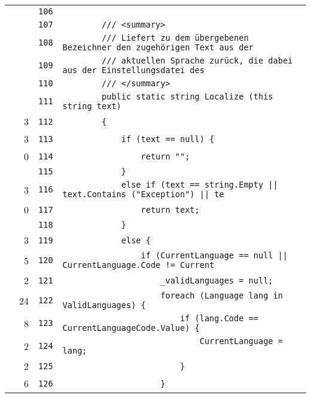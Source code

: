 \documentclass[a4paper,10pt]{article}
\begin{document}
\begin{longtable}[l]{lrrl}
\cellcolor{gray} &  & \verb~106~ & \verb~~\\
\cellcolor{gray} &  & \verb~107~ & \verb~        /// <summary>~\\
\cellcolor{gray} &  & \verb~108~ & \verb~        /// Liefert zu dem übergebenen Bezeichner den zugehörigen Text aus der~\\
\cellcolor{gray} &  & \verb~109~ & \verb~        /// aktuellen Sprache zurück, die dabei aus der Einstellungsdatei des ~\\
\cellcolor{gray} &  & \verb~110~ & \verb~        /// </summary>~\\
\cellcolor{gray} &  & \verb~111~ & \verb~        public static string Localize (this string text)~\\
\cellcolor{green} & 3 & \verb~112~ & \verb~        {~\\
\cellcolor{green} & 3 & \verb~113~ & \verb~            if (text == null) {~\\
\cellcolor{red} & 0 & \verb~114~ & \verb~                return "";~\\
\cellcolor{gray} &  & \verb~115~ & \verb~            }~\\
\cellcolor{green} & 3 & \verb~116~ & \verb~            else if (text == string.Empty || text.Contains ("Exception") || te~\\
\cellcolor{red} & 0 & \verb~117~ & \verb~                return text;~\\
\cellcolor{gray} &  & \verb~118~ & \verb~            }~\\
\cellcolor{green} & 3 & \verb~119~ & \verb~            else {~\\
\cellcolor{green} & 5 & \verb~120~ & \verb~                if (CurrentLanguage == null || CurrentLanguage.Code != Current~\\
\cellcolor{green} & 2 & \verb~121~ & \verb~                    _validLanguages = null;~\\
\cellcolor{green} & 24 & \verb~122~ & \verb~                    foreach (Language lang in ValidLanguages) {~\\
\cellcolor{green} & 8 & \verb~123~ & \verb~                        if (lang.Code == CurrentLanguageCode.Value) {~\\
\cellcolor{green} & 2 & \verb~124~ & \verb~                            CurrentLanguage = lang;~\\
\cellcolor{green} & 2 & \verb~125~ & \verb~                        }~\\
\cellcolor{green} & 6 & \verb~126~ & \verb~                    }~\\

\end{longtable}
\end{document}
